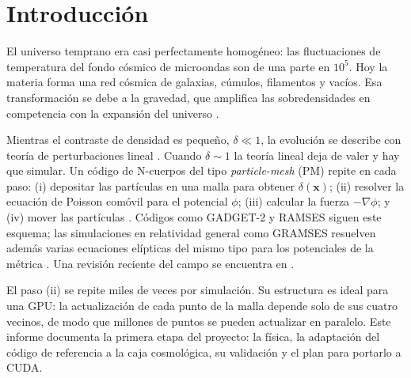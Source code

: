 \documentclass{aa}
\newcommand{\vx}{\mathbf{x}}
\begin{document}

   \maketitle
   \nolinenumbers

\section{Introducción}

El universo temprano era casi perfectamente homogéneo: las fluctuaciones de temperatura del fondo cósmico de microondas son de una parte en $10^5$. Hoy la materia forma una red cósmica de galaxias, cúmulos, filamentos y vacíos. Esa transformación se debe a la gravedad, que amplifica las sobredensidades en competencia con la expansión del universo \citep{Peebles1980,Dodelson2020}.

Mientras el contraste de densidad es pequeño, $\delta\ll1$, la evolución se describe con teoría de perturbaciones lineal \citep{Bernardeau2002}. Cuando $\delta\sim1$ la teoría lineal deja de valer y hay que simular. Un código de N-cuerpos del tipo \emph{particle-mesh} (PM) repite en cada paso: (i) depositar las partículas en una malla para obtener $\delta(\vx)$; (ii) resolver la ecuación de Poisson comóvil para el potencial $\phi$; (iii) calcular la fuerza $-\nabla\phi$; y (iv) mover las partículas \citep{Hockney1988,Bertschinger1998}. Códigos como GADGET-2 \citep{Springel2005} y RAMSES \citep{Teyssier2002} siguen este esquema; las simulaciones en relatividad general como GRAMSES resuelven además varias ecuaciones elípticas del mismo tipo para los potenciales de la métrica \citep{BarreraHinojosa2020a,BarreraHinojosa2020b}. Una revisión reciente del campo se encuentra en \citet{AnguloHahn2022}.

El paso (ii) se repite miles de veces por simulación. Su estructura es ideal para una GPU: la actualización de cada punto de la malla depende solo de sus cuatro vecinos, de modo que millones de puntos se pueden actualizar en paralelo. Este informe documenta la primera etapa del proyecto: la física, la adaptación del código de referencia a la caja cosmológica, su validación y el plan para portarlo a CUDA.

\end{document}
